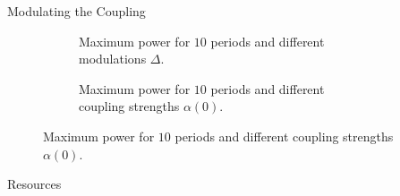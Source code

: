 \documentclass[draft]{beamer}
\newlength{\sepwidth}
\newlength{\colwidth}
\newcommand{\separatorcolumn}{\begin{column}{\sepwidth}\end{column}}
\begin{document}
\begin{frame}[t]
\begin{columns}[t]
\begin{column}{\colwidth}
\begin{block}{Modulating the Coupling}
\begin{figure}[H]
\begin{subfigure}[t]{.49\linewidth}
        \caption{Maximum power for \(10\) periods and different
          modulations \(Δ\).}
      \end{subfigure}
      \begin{subfigure}[t]{.49\linewidth}
        \caption{Maximum power for \(10\) periods and different
          coupling strengths \(α(0)\).}
      \end{subfigure}
    \end{figure}
  \end{block}
  \begin{block}{Resources}
    {\AtNextBibliography{\tiny} \printbibliography}
  \end{block}
\end{column}

\separatorcolumn
\end{columns}
\end{frame}
\end{document}
